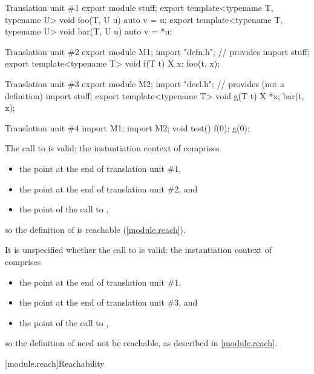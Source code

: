 \pnum
\begin{example}
\begin{codeblocktu}{Translation unit \#1}
export module stuff;
export template<typename T, typename U> void foo(T, U u) { auto v = u; }
export template<typename T, typename U> void bar(T, U u) { auto v = *u; }
\end{codeblocktu}

\begin{codeblocktu}{Translation unit \#2}
export module M1;
import "defn.h";        // provides 
import stuff;
export template<typename T> void f(T t) {
  X x;
  foo(t, x);
}
\end{codeblocktu}

\begin{codeblocktu}{Translation unit \#3}
export module M2;
import "decl.h";        // provides  (not a definition)
import stuff;
export template<typename T> void g(T t) {
  X *x;
  bar(t, x);
}
\end{codeblocktu}

\begin{codeblocktu}{Translation unit \#4}
import M1;
import M2;
void test() {
  f(0);
  g(0);
}
\end{codeblocktu}
The call to  is valid;
the instantiation context of  comprises
\begin{itemize}
\item the point at the end of translation unit \#1,
\item the point at the end of translation unit \#2, and
\item the point of the call to ,
\end{itemize}
so the definition of  is reachable (\ref{module.reach}).

It is unspecified whether the call to  is valid:
the instantiation context of  comprises
\begin{itemize}
\item the point at the end of translation unit \#1,
\item the point at the end of translation unit \#3, and
\item the point of the call to ,
\end{itemize}
so the definition of  need not be reachable,
as described in \ref{module.reach}.
\end{example}

[module.reach]{Reachability}

